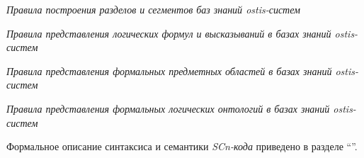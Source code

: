 \begin{SCn}
{\begin{scnvector}
{\begin{scnitemize}
				            \item \textit{Правила построения разделов и сегментов
					            баз знаний ostis-систем}
				            \item \textit{Правила представления логических формул и высказываний в базах знаний ostis-систем}
				            \item \textit{Правила представления формальных предметных областей в базах знаний ostis-систем}
				            \item \textit{Правила представления формальных логических онтологий в базах знаний ostis-систем}
			            \end{scnitemize}}
			\item{Формальное описание синтаксиса и семантики
			            \textit{SCn-кода} приведено в разделе ``''.}
		\end{scnvector}
	}


\end{SCn}

